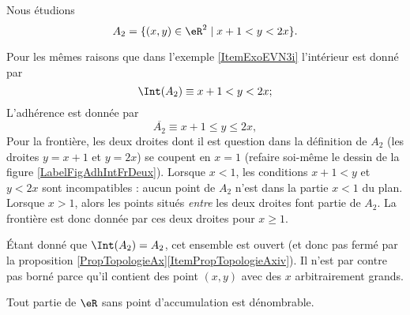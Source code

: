 \begin{example}\label{ItemExoEVN3ii}
	Nous étudions
	\begin{equation}
		A_2 = \{ (x, y ) \in \eR^2 \; | \; x+ 1 < y < 2x \}.
	\end{equation}

	Pour les mêmes raisons que dans l'exemple \ref{ItemExoEVN3i} l'intérieur est donné par
	\begin{equation}
		\Int(A_2)\equiv x+1<y<2x;
	\end{equation}
	L'adhérence est donnée par
	\begin{equation}
		\overline{ A_2 }\equiv x+1\leq y\leq 2x,
	\end{equation}
	Pour la frontière, les deux droites dont il est question dans la définition de $A_2$ (les droites $y=x+1$ et $y=2x$) se coupent en $x=1$ (refaire soi-même le dessin de la figure \ref{LabelFigAdhIntFrDeux}). Lorsque $x<1$, les conditions $x+1<y$ et $y<2x$ sont incompatibles : aucun point de $A_2$ n'est dans la partie $x<1$ du plan. Lorsque $x>1$, alors les points situés \emph{entre} les deux droites font partie de $A_2$. La frontière est donc donnée par ces deux droites pour $x\geq 1$.

	Étant donné que $\Int(A_2)=A_2$, cet ensemble est ouvert (et donc pas fermé par la proposition \ref{PropTopologieAx}\ref{ItemPropTopologieAxiv}). Il n'est par contre pas borné parce qu'il contient des point $(x,y)$ avec des $x$ arbitrairement grands.
\end{example}

\newcommand{\CaptionFigAdhIntFrDeux}{Notez que le point d'angle fait partie de la frontière, mais pas de l'ensemble. Exemple \ref{ItemExoEVN3ii}.}



\begin{proposition}
	Tout partie de \( \eR\) sans point d'accumulation est dénombrable.
\end{proposition}

